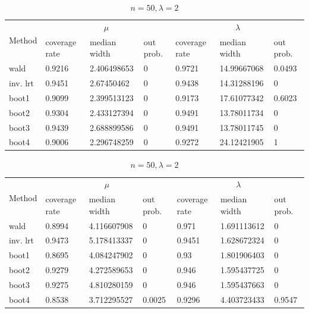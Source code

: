 \documentclass{article}
\begin{document}
\begin{table}
        \begin{subtable}[b]{\textwidth}
		\centering
		\begin{tabular}{l|lll|lll}
		\toprule
        \multirow{2}{*}{Method} & \multicolumn{3}{c|}{$\mu$}      & \multicolumn{3}{c}{$\lambda$}  \\ 
                           & coverage rate & median width & out prob. & coverage rate & median width & out prob. \\
                           \midrule
wald      &0.9216	&2.406498653	&0 &0.9721	&14.99667068	&0.0493\\
inv. lrt  &0.9451	&2.67450462	    &0 &0.9438	&14.31288196	&0     \\
boot1     &0.9099	&2.399513123	&0 &0.9173	&17.61077342	&0.6023\\
boot2     &0.9304	&2.433127394	&0 &0.9491	&13.78011734	&0     \\
boot3     &0.9439	&2.688899586	&0 &0.9491	&13.78011745	&0     \\
boot4     &0.9006	&2.296748259	&0 &0.9272	&24.12421905	&1     \\
       \bottomrule
       \end{tabular}
       \caption{$n = 25, \lambda = 12$}
       \label{25_12}
       \end{subtable}%

        \begin{subtable}[b]{\textwidth}
		\centering
		\begin{tabular}{l|lll|lll}
		\toprule
        \multirow{2}{*}{Method} & \multicolumn{3}{c|}{$\mu$}      & \multicolumn{3}{c}{$\lambda$}  \\ 
                           & coverage rate & median width & out prob. & coverage rate & median width & out prob. \\
                           \midrule
wald      & 0.8994	&4.116607908	&0      & 0.971	  &1.691113612	&0     \\ 
inv. lrt  & 0.9473	&5.178413337	&0      & 0.9451  &1.628672324	&0     \\ 
boot1     & 0.8695	&4.084247902	&0      & 0.93	  &1.801906403	&0     \\ 
boot2     & 0.9279	&4.272589653	&0      & 0.946	  &1.595437725	&0     \\ 
boot3     & 0.9275	&4.810280159	&0      & 0.946	  &1.595437663	&0     \\ 
boot4     & 0.8538	&3.712295527	&0.0025 & 0.9296  &4.403723433	&0.9547\\ 
       \bottomrule
       \end{tabular}
       \caption{$n = 50, \lambda = 2$}
       \label{50_2}
       \end{subtable}%


\end{table}
\end{document}

